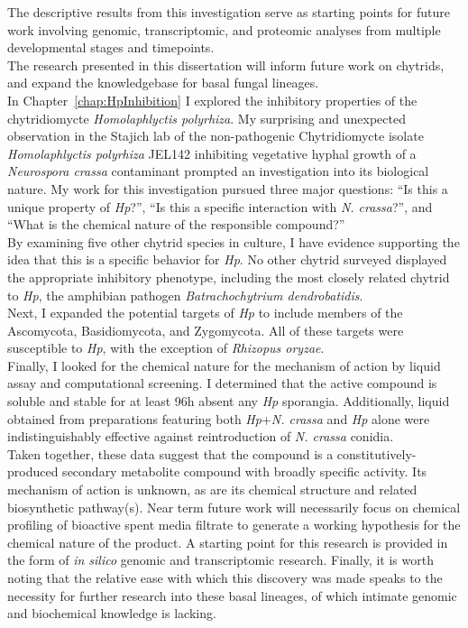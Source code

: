 \indent The descriptive results from this investigation serve as starting points for future work involving genomic, transcriptomic, and proteomic analyses from multiple developmental stages and timepoints.\\
\indent The research presented in this dissertation will inform future work on chytrids, and expand the knowledgebase for basal fungal lineages.\\

\indent In Chapter~\ref{chap:HpInhibition} I explored the inhibitory properties of the chytridiomycte \textit{Homolaphlyctis polyrhiza}. My surprising and unexpected observation in the Stajich lab of the non-pathogenic Chytridiomycte isolate \textit{Homolaphlyctis polyrhiza} JEL142 inhibiting vegetative hyphal growth of a \textit{Neurospora crassa} contaminant prompted an investigation into its biological nature. My work for this investigation pursued three major questions: \enquote{Is this a unique property of \textit{Hp}?}, \enquote{Is this a specific interaction with \textit{N. crassa}?}, and \enquote{What is the chemical nature of the responsible compound?}\\
\indent By examining five other chytrid species in culture, I have evidence supporting the idea that this is a specific behavior for \textit{Hp}. No other chytrid surveyed displayed the appropriate inhibitory phenotype, including the most closely related chytrid to \textit{Hp}, the amphibian pathogen \textit{Batrachochytrium dendrobatidis}.\\
\indent Next, I expanded the potential targets of \textit{Hp} to include members of the Ascomycota, Basidiomycota, and Zygomycota. All of these targets were susceptible to \textit{Hp}, with the exception of \textit{Rhizopus oryzae}.\\
\indent Finally, I looked for the chemical nature for the mechanism of action by liquid assay and computational screening. I determined that the active compound is soluble and stable for at least 96h absent any \textit{Hp} sporangia. Additionally, liquid obtained from preparations featuring both \textit{Hp}+\textit{N. crassa} and \textit{Hp} alone were indistinguishably effective against reintroduction of \textit{N. crassa} conidia.\\
\indent Taken together, these data suggest that the compound is a constitutively-produced secondary metabolite compound with broadly specific activity. Its mechanism of action is unknown, as are its chemical structure and related biosynthetic pathway(s). Near term future work will necessarily focus on chemical profiling of bioactive spent media filtrate to generate a working hypothesis for the chemical nature of the product. A starting point for this research is provided in the form of \textit{in silico} genomic and transcriptomic research. Finally, it is worth noting that the relative ease with which this discovery was made speaks to the necessity for further research into these basal lineages, of which intimate genomic and biochemical knowledge is lacking.\\
